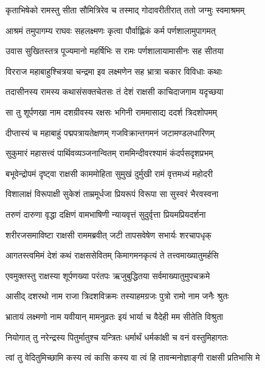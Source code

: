 
\twolineshloka
{कृताभिषेको रामस्तु सीता सौमित्रिरेव च}
{तस्माद् गोदावरीतीरात् ततो जग्मुः स्वमाश्रमम्} %

\twolineshloka
{आश्रमं तमुपागम्य राघवः सहलक्ष्मणः}
{कृत्वा पौर्वाह्णिकं कर्म पर्णशालामुपागमत्} %

\twolineshloka
{उवास सुखितस्तत्र पूज्यमानो महर्षिभिः}
{स रामः पर्णशालायामासीनः सह सीतया} %

\twolineshloka
{विरराज महाबाहुश्चित्रया चन्द्रमा इव}
{लक्ष्मणेन सह भ्रात्रा चकार विविधाः कथाः} %

\twolineshloka
{तदासीनस्य रामस्य कथासंसक्तचेतसः}
{तं देशं राक्षसी काचिदाजगाम यदृच्छया} %

\twolineshloka
{सा तु शूर्पणखा नाम दशग्रीवस्य रक्षसः}
{भगिनी राममासाद्य ददर्श त्रिदशोपमम्} %

\twolineshloka
{दीप्तास्यं च महाबाहुं पद्मपत्रायतेक्षणम्}
{गजविक्रान्तगमनं जटामण्डलधारिणम्} %

\twolineshloka
{सुकुमारं महासत्त्वं पार्थिवव्यञ्जनान्वितम्}
{राममिन्दीवरश्यामं कंदर्पसदृशप्रभम्} %

\twolineshloka
{बभूवेन्द्रोपमं दृष्ट्वा राक्षसी काममोहिता}
{सुमुखं दुर्मुखी रामं वृत्तमध्यं महोदरी} %

\twolineshloka
{विशालाक्षं विरूपाक्षी सुकेशं ताम्रमूर्धजा}
{प्रियरूपं विरूपा सा सुस्वरं भैरवस्वना} %

\twolineshloka
{तरुणं दारुणा वृद्धा दक्षिणं वामभाषिणी}
{न्यायवृत्तं सुदुर्वृत्ता प्रियमप्रियदर्शना} %

\twolineshloka
{शरीरजसमाविष्टा राक्षसी राममब्रवीत्}
{जटी तापसवेषेण सभार्यः शरचापधृक्} %

\twolineshloka
{आगतस्त्वमिमं देशं कथं राक्षससेवितम्}
{किमागमनकृत्यं ते तत्त्वमाख्यातुमर्हसि} %

\twolineshloka
{एवमुक्तस्तु राक्षस्या शूर्पणख्या परंतपः}
{ऋजुबुद्धितया सर्वमाख्यातुमुपचक्रमे} %

\twolineshloka
{आसीद् दशरथो नाम राजा त्रिदशविक्रमः}
{तस्याहमग्रजः पुत्रो रामो नाम जनैः श्रुतः} %

\twolineshloka
{भ्रातायं लक्ष्मणो नाम यवीयान् मामनुव्रतः}
{इयं भार्या च वैदेही मम सीतेति विश्रुता} %

\twolineshloka
{नियोगात् तु नरेन्द्रस्य पितुर्मातुश्च यन्त्रितः}
{धर्मार्थं धर्मकांक्षी च वनं वस्तुमिहागतः} %

\twolineshloka
{त्वां तु वेदितुमिच्छामि कस्य त्वं कासि कस्य वा}
{त्वं हि तावन्मनोज्ञाङ्गी राक्षसी प्रतिभासि मे} %

